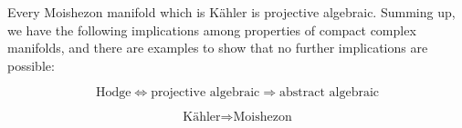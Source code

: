 Every Moishezon manifold which is Kähler is projective algebraic. Summing up, we have the following implications among properties of compact complex manifolds, and there are examples to show that no further implications are possible:

$$\text{Hodge} \iff \text{projective algebraic} \Rightarrow \text{abstract algebraic}$$

$$\text{Kähler} \Rightarrow \text{Moishezon}$$

